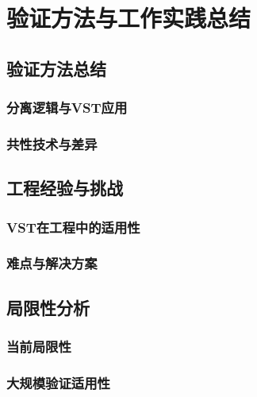 \chapter{验证方法与工作实践总结}
\section{验证方法总结}
\subsection{分离逻辑与VST应用}
\subsection{共性技术与差异}
\section{工程经验与挑战}
\subsection{VST在工程中的适用性}
\subsection{难点与解决方案}
\section{局限性分析}
\subsection{当前局限性}
\subsection{大规模验证适用性}